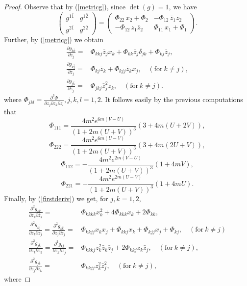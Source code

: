 \documentclass[11pt, reqno]{amsart}
\begin{document}
\begin{proof}
Observe that by (\ref{metricg}), since $\det(g)=1$, we have
\begin{equation}\label{metricginv}
\left(
\begin{array}{cc}
g^{1\bar 1} & g^{1\bar 2}   \\
g^{2\bar 1}  & g^{2\bar 2}
\end{array}
\right)=\left(
\begin{array}{cc}
\Phi_{22}\,x_2+\Phi_2 &-\Phi_{12}\,\bar z_1 z_2    \\
- \Phi_{12}\, z_1\bar z_2 &  \Phi_{11}\,x_1+\Phi_{1}
\end{array}
\right).
\end{equation}
Further, by (\ref{metricg}) we obtain
\begin{equation}\label{firstderiv}
\begin{split}
\frac{{\partial} g_{k\bar k}}{{\partial} z_j}=&\Phi_{kkj}\bar z_j x_k+\Phi_{kk}\bar z_j\delta_{jk}+\Phi_{kj}\bar z_j,\\
\frac{{\partial} g_{k\bar j}}{{\partial} z_j}=&\Phi_{kj}\bar z_k+\Phi_{kjj}\bar z_k x_j,\quad (\textrm{for}\ k\neq j),\\
\frac{{\partial} g_{j\bar k}}{{\partial} z_j}=&\Phi_{jkj}\bar z_j^2z_k,\quad (\textrm{for}\ k\neq j).
\end{split}
\end{equation}
where $\Phi_{jkl}=\frac{\partial^3\Phi}{\partial z_j\partial z_k\partial z_l}, j, k, l=1, 2.$
It  follows easily by the previous computations that
$$\Phi_{111}=\frac{4m^2e^{6m(V-U)}}{(1+2m(U+V))^3}(3+4m(U+2V)),$$
$$\Phi_{222}=\frac{4m^2e^{6m(U-V)}}{(1+2m(U+V))^3}(3+4m(2U+V)),$$
$$\Phi_{112}=-\frac{4m^2e^{2m(V-U)}}{(1+2m(U+V))^3}(1+4mV),$$
$$\Phi_{221}=-\frac{4m^2e^{2m(U-V)}}{(1+2m(U+V))^3}(1+4mU).$$
Finally, by (\ref{firstderiv}) we get, for  $ j, k=1, 2$,
\begin{equation*}
\begin{split}
\frac{{\partial}^2 g_{k\bar k}}{{\partial} z_k{\partial} \bar z_k}=&\Phi_{kkkk}x^2_k+4\Phi_{kkk}x_k+2\Phi_{kk},\\
\frac{{\partial}^2 g_{k\bar j}}{{\partial} z_k{\partial} \bar z_j}=\frac{{\partial}^2 g_{k\bar k}}{{\partial} z_j{\partial} \bar z_j}=&\Phi_{kkjj}x_kx_j+\Phi_{kkj}x_k+\Phi_{kjj}x_j+\Phi_{kj},\quad (\textrm{for}\ k\neq j)\\
\frac{{\partial}^2 g_{j\bar k}}{{\partial} z_k{\partial} \bar z_k}=\frac{{\partial}^2 g_{k\bar k}}{{\partial} z_k{\partial} \bar z_j}=&\Phi_{kkkj}z_k^2\bar z_k\bar z_j+2\Phi_{kkj}z_k\bar z_j,\quad (\textrm{for}\ k\neq j),\\
\frac{{\partial}^2 g_{j\bar k}}{{\partial} z_j{\partial} \bar z_k}=&\Phi_{kkjj}z_k^2\bar z_j^2,\quad (\textrm{for}\ k\neq j),
\end{split}
\end{equation*}
where


\end{proof}
\end{document}
